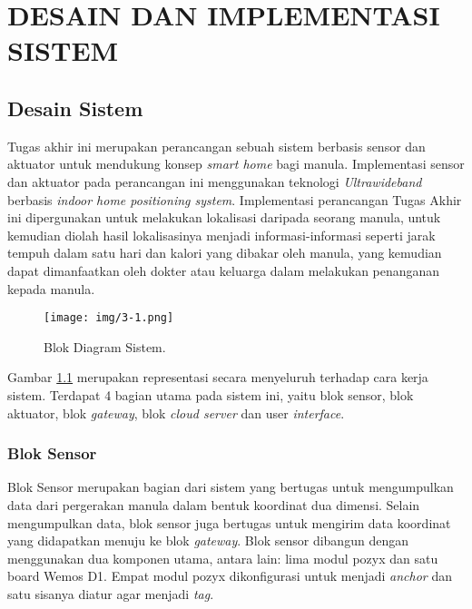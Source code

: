 \chapter{DESAIN DAN IMPLEMENTASI SISTEM}
\vspace{1ex}
\section{Desain Sistem}
\vspace{1ex}

Tugas akhir ini merupakan perancangan sebuah sistem berbasis sensor dan aktuator untuk mendukung konsep \textit{smart home} bagi manula. Implementasi sensor dan aktuator pada perancangan ini menggunakan teknologi \textit{Ultrawideband} berbasis \textit{indoor home positioning system}. Implementasi perancangan Tugas Akhir ini dipergunakan untuk melakukan lokalisasi daripada seorang manula, untuk kemudian diolah hasil lokalisasinya menjadi informasi-informasi seperti jarak tempuh dalam satu hari dan kalori yang dibakar oleh manula, yang kemudian dapat dimanfaatkan oleh dokter atau keluarga dalam melakukan penanganan kepada manula.
\begin{figure} []
	\captionsetup{justification=centering}
	\texttt{[image: img/3-1.png]}
	\caption{Blok Diagram Sistem.}
	\label{fig: 3_1}
\end{figure}
Gambar \ref{fig: 3_1} merupakan representasi secara menyeluruh terhadap cara kerja sistem. Terdapat 4 bagian utama pada sistem ini, yaitu blok sensor, blok aktuator, blok\textit{ gateway}, blok \textit{cloud server} dan user \textit{interface}.
\subsection{Blok Sensor}
\vspace{1ex}
Blok Sensor merupakan bagian dari sistem yang bertugas untuk mengumpulkan data dari pergerakan manula dalam bentuk koordinat dua dimensi. Selain mengumpulkan data, blok sensor juga bertugas untuk mengirim data koordinat yang didapatkan menuju ke blok \textit{gateway}. Blok sensor dibangun dengan menggunakan dua komponen utama, antara lain: lima modul pozyx dan satu board Wemos D1. Empat modul pozyx dikonfigurasi untuk menjadi \textit{anchor} dan satu sisanya diatur agar menjadi \textit{tag}.
